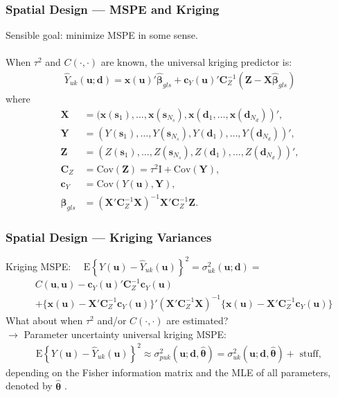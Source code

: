 \documentclass[xcolor=dvipsnames]{beamer}
\begin{document}
\begin{frame}
\frametitle{Spatial Design --- MSPE and Kriging}
Sensible goal: minimize MSPE in some sense.\\~\\

When $\tau^2$ and $C(\cdot, \cdot)$ are known, the universal kriging predictor is:
\begin{align*}
\widehat{Y}_{uk}(\bm{u}; \bm{d}) = \bm{x}(\bm{u})'\widehat{\bm{\beta}}_{gls} + \bm{c}_Y(\bm{u})'\bm{C}_Z^{-1}(\bm{Z} - \bm{X}\widehat{\bm{\beta}}_{gls})
\end{align*}
\citep{cressie2011statistics} where
\begin{align*}
\bm{X} &= (\bm{x}(\bm{s}_1), \dots, \bm{x}(\bm{s}_{N_s}), \bm{x}(\bm{d}_1, \dots, \bm{x}(\bm{d}_{N_d}))',\\
\bm{Y} &= (Y(\bm{s}_1), \dots, Y(\bm{s}_{N_s}), Y(\bm{d}_1), \dots, Y(\bm{d}_{N_d}))',\\
\bm{Z} &= (Z(\bm{s}_1), \dots, Z(\bm{s}_{N_s}), Z(\bm{d}_1), \dots, Z(\bm{d}_{N_d}))',\\
\bm{C}_Z &= \mathrm{Cov}(\bm{Z}) = \tau^2\bm{\mathrm{I}} + \mathrm{Cov}(\bm{Y}),\\
\bm{c}_Y &= \mathrm{Cov}(Y(\bm{u}), \bm{Y}),\\
\widehat{\bm{\beta}}_{gls} &= (\bm{X}'\bm{C}_Z^{-1}\bm{X})^{-1}\bm{X}'\bm{C}_Z^{-1}\bm{Z}.
\end{align*}
\end{frame}

\begin{frame}
\frametitle{Spatial Design --- Kriging Variances}
Kriging MSPE: \ \ $\mathrm{E}\left\{Y(\bm{u}) - \widehat{Y}_{uk}(\bm{u})\right\}^2 = \sigma_{uk}^2(\bm{u};\bm{d})=$
\begin{align*}
&C(\bm{u}, \bm{u}) - \bm{c}_Y(\bm{u})'\bm{C}_Z^{-1}\bm{c}_Y(\bm{u})\\
& + \{\bm{x}(\bm{u})  - \bm{X}'\bm{C}_Z^{-1}\bm{c}_Y(\bm{u})\}'(\bm{X}'\bm{C}_Z^{-1}\bm{X})^{-1}\{\bm{x}(\bm{u})  - \bm{X}'\bm{C}_Z^{-1}\bm{c}_Y(\bm{u})\}
\end{align*}
\pause
What about when $\tau^2$ and/or $C(\cdot, \cdot)$ are estimated?\\
$\to$ Parameter uncertainty universal kriging MSPE:
\begin{align*}
\mathrm{E}\left\{Y(\bm{u}) - \widehat{Y}_{uk}(\bm{u})\right\}^2 \approx \sigma^2_{puk}(\bm{u};\bm{d},\widehat{\bm{\theta}}) = \sigma^2_{uk}(\bm{u};\bm{d},\widehat{\bm{\theta}}) + \mbox{ stuff, }
\end{align*}
depending on the Fisher information matrix and the MLE of all parameters, denoted by $\widehat{\bm{\theta}}$ \citep{zimmerman1992mean,abt1999estimating}.
\end{frame}
\end{document}
